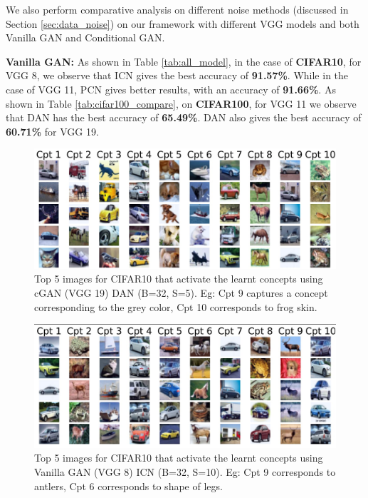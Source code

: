 \documentclass[letterpaper]{article}
\begin{document}
We also perform comparative analysis on different noise methods (discussed in Section \ref{sec:data_noise}) on our framework with different VGG models and both Vanilla GAN and Conditional GAN.

\textbf{Vanilla GAN:}\label{sec:van_gan} 
As shown in Table \ref{tab:all_model}, in the case of \textbf{CIFAR10}, for VGG 8, we observe that ICN  gives the best accuracy of \textbf{91.57\%}. While in the case of VGG 11, PCN  gives better results, with an accuracy of \textbf{91.66\%}. 
As shown in Table \ref{tab:cifar100_compare}, on \textbf{CIFAR100}, for VGG 11 we observe that DAN  has the best accuracy of \textbf{65.49\%}. DAN  also gives the best accuracy of \textbf{60.71\%} for VGG 19.



\begin{figure}[h!]
    \centering
    \includegraphics[width=1.0\columnwidth]{images/cgan19.jpg}
    \caption{Top 5 images for CIFAR10 that activate the learnt concepts using cGAN (VGG 19) DAN (B=32, S=5). Eg: Cpt 9 captures a concept corresponding to the grey color, Cpt 10 corresponds to frog skin.}
    \label{fig:cgan19}
\end{figure}

\begin{figure}[h!]
    \centering
    \includegraphics[width=1.0\columnwidth]{images/vcan8.jpg}
    \caption{Top 5 images for CIFAR10 that activate the learnt concepts using Vanilla GAN (VGG 8) ICN  (B=32, S=10). Eg: Cpt 9 corresponds to antlers, Cpt 6 corresponds to shape of legs.}
    \label{fig:vgan8}
\end{figure}
\end{document}
